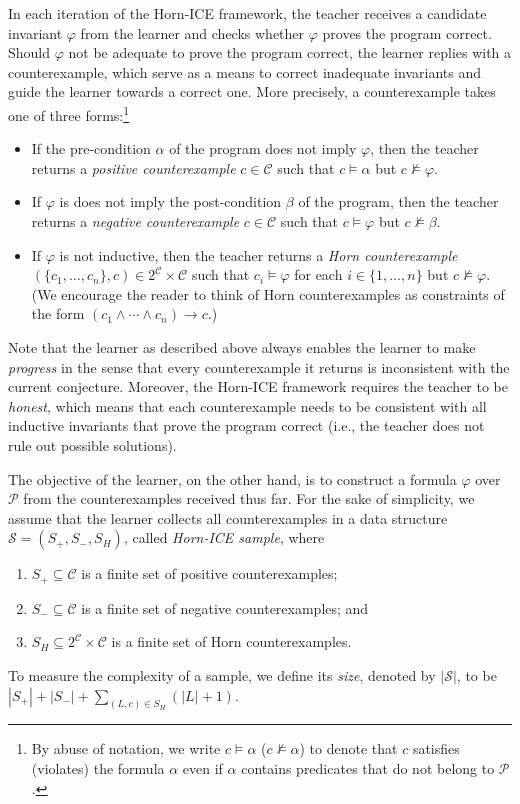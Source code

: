In each iteration of the Horn-ICE framework, the teacher receives a candidate invariant $\varphi$ from the learner and checks whether $\varphi$ proves the program correct.
Should $\varphi$ not be adequate to prove the program correct, the learner replies with a counterexample, which serve as a means to correct inadequate invariants and guide the learner towards a correct one.
More precisely, a counterexample takes one of three forms:\footnote{By abuse of notation, we write $c \models \alpha$ ($c \not\models \alpha$) to denote that $c$ satisfies (violates) the formula $\alpha$ even if $\alpha$ contains predicates that do not belong to $\mathcal P$.}
\begin{itemize}
    \item If the pre-condition $\alpha$ of the program does not imply $\varphi$, then the teacher returns a \emph{positive counterexample} $c \in \mathcal C$ such that $c \models \alpha$ but $c \not \models \varphi$.
    \item If $\varphi$ is does not imply the post-condition $\beta$ of the program, then the teacher returns a \emph{negative counterexample} $c \in \mathcal C$ such that $c \models \varphi$ but $c \not \models \beta$.
     \item If $\varphi$ is not inductive, then the teacher returns a \emph{Horn counterexample} $(\{ c_1, \ldots, c_n \}, c) \in 2^\mathcal C \times \mathcal C$ such that $c_i \models \varphi$ for each $i \in \{ 1, \ldots, n \}$ but $c \not\models \varphi$. (We encourage the reader to think of Horn counterexamples as constraints of the form $(c_1 \land \cdots \land c_n) \rightarrow c$.)
\end{itemize}
Note that the learner as described above always enables the learner to make \emph{progress} in the sense that every counterexample it returns is inconsistent with the current conjecture.
Moreover, the Horn-ICE framework requires the teacher to be \emph{honest}, which means that each counterexample needs to be consistent with all inductive invariants that prove the program correct (i.e., the teacher does not rule out possible solutions).

The objective of the learner, on the other hand, is to construct a formula $\varphi$ over $\mathcal P$ from the counterexamples received thus far.
For the sake of simplicity, we assume that the learner collects all counterexamples in a data structure $\mathcal S = (S_+, S_-, S_H)$, called \emph{Horn-ICE sample}, where
\begin{enumerate}[label={\alph*)}]
    \item $S_+ \subseteq \mathcal C$ is a finite set of positive counterexamples;
    \item $S_- \subseteq \mathcal C$ is a finite set of negative counterexamples; and
    \item $S_H \subseteq 2^\mathcal C \times \mathcal C$ is a finite set of Horn counterexamples.
\end{enumerate}
To measure the complexity of a sample, we define its \emph{size}, denoted by $|\mathcal S|$, to be $|S_+| + |S_-| + \sum_{(L, c) \in S_H} (|L| + 1)$.

